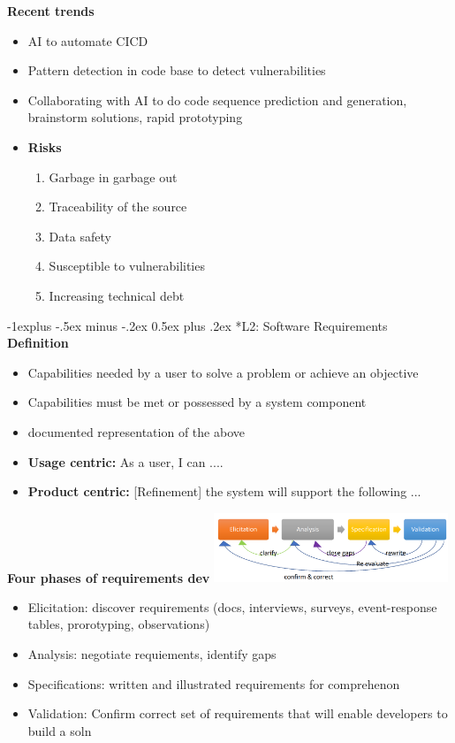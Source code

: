 \documentclass[10pt, landscape]{article}
\makeatletter
\renewcommand{\subsection}{\@startsection{subsection}{2}{0mm}%
                                {-1explus -.5ex minus -.2ex}%
                                {0.5ex plus .2ex}%
                                {\normalfont\normalsize\bfseries}}
\makeatother
\begin{document}
\begin{multicols}{4}
\textbf{Recent trends}
\begin{itemize}
  \item AI to automate CICD
  \item Pattern detection in code base to detect vulnerabilities
  \item Collaborating with AI to do code sequence prediction and generation, brainstorm solutions, rapid prototyping
  \item \textbf{Risks}
  \begin{enumerate}
    \item Garbage in garbage out 
    \item Traceability of the source 
    \item Data safety 
    \item Susceptible to vulnerabilities 
    \item Increasing technical debt
  \end{enumerate}
\end{itemize}

\subsection*{L2: Software Requirements}
\textbf{Definition}
\begin{itemize}
  \item Capabilities needed by a user to solve a problem or achieve an objective
  \item Capabilities must be met or possessed by a system component
  \item documented representation of the above 
  \item \textbf{Usage centric:} As a user, I can ....
  \item \textbf{Product centric:} [Refinement] the system will support the following ...
\end{itemize}

\textbf{Four phases of requirements dev}
\includegraphics*[width=7cm]{req_phase}
\begin{itemize}
  \item Elicitation: discover requirements (docs, interviews, surveys, event-response tables, prorotyping, observations)
  \item Analysis: negotiate requiements, identify gaps 
  \item Specifications: written and illustrated requirements for comprehenon 
  \item Validation: Confirm correct set of requirements that will enable developers to build a soln 
\end{itemize}


\end{multicols}
\end{document}
